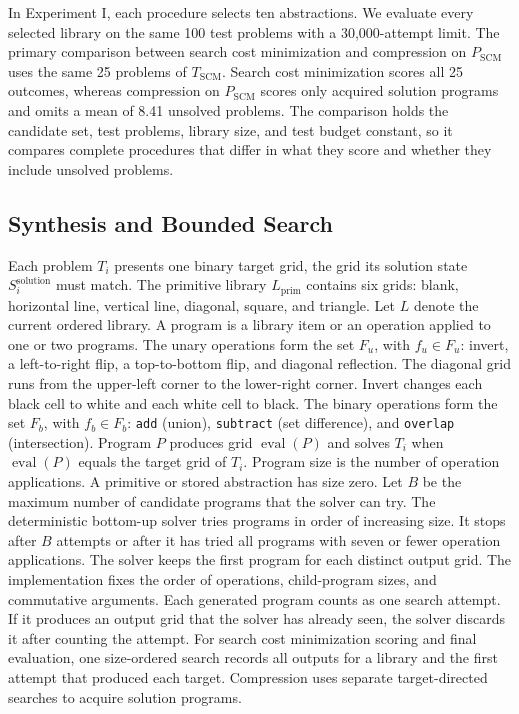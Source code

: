 \documentclass[10pt]{article}
\begin{document}
In Experiment I, each procedure selects ten abstractions. We evaluate every
selected library on the same 100 test problems with a 30,000-attempt limit.
The primary comparison between search cost minimization and compression on
$P_{\mathrm{SCM}}$ uses the same 25 problems of
$T_{\mathrm{SCM}}$. Search cost minimization scores all 25
outcomes, whereas compression on $P_{\mathrm{SCM}}$ scores only
acquired solution programs and omits a mean of 8.41 unsolved problems.
The comparison holds the candidate set, test problems, library size, and test
budget constant, so it compares complete procedures that differ in what they
score and whether they include unsolved problems.

\subsection{Synthesis and Bounded Search}

Each problem $T_i$ presents one binary target grid, the grid its solution
state $S_i^{\mathrm{solution}}$ must match. The primitive library
$L_{\mathrm{prim}}$ contains six grids: blank, horizontal line, vertical
line, diagonal, square, and triangle. Let $L$ denote the current ordered
library. A program is a library item or an operation applied to one or two
programs. The unary operations form the set $F_u$, with
$f_u\in F_u$: invert, a left-to-right flip, a top-to-bottom flip,
and diagonal reflection. The diagonal grid runs from the upper-left corner to
the lower-right corner. Invert changes each black cell to white and each
white cell to black. The binary operations form the set $F_b$, with
$f_b\in F_b$: \texttt{add} (union), \texttt{subtract} (set
difference), and \texttt{overlap} (intersection). Program $P$ produces grid
$\operatorname{eval}(P)$ and solves $T_i$ when $\operatorname{eval}(P)$
equals the target grid of $T_i$.
Program size is the number of operation applications. A primitive or stored
abstraction has size zero. Let $B$ be the maximum number of candidate programs
that the solver can try. The deterministic bottom-up solver tries programs in
order of increasing size. It stops after $B$ attempts or after it has tried all
programs with seven or fewer operation applications. The solver keeps the first
program for each distinct output grid. The implementation fixes the order of
operations, child-program sizes, and commutative arguments. Each generated
program counts as one search attempt. If it produces an output grid that the
solver has already seen, the solver discards it after counting the attempt.
For search cost minimization scoring and final evaluation, one size-ordered
search records all outputs for a library and the first attempt that produced
each target. Compression uses separate target-directed searches
to acquire solution programs.
\end{document}
